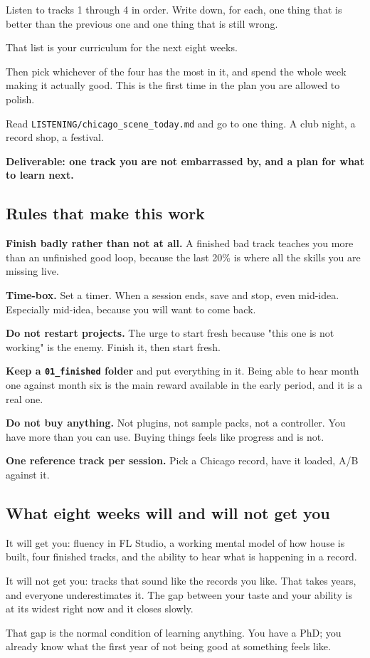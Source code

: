 Listen to tracks 1 through 4 in order. Write down, for each, one thing that is better than
the previous one and one thing that is still wrong.

That list is your curriculum for the next eight weeks.

Then pick whichever of the four has the most in it, and spend the whole week making it
actually good. This is the first time in the plan you are allowed to polish.

Read \texttt{LISTENING/chicago\_scene\_today.md} and go to one thing. A club night, a record shop, a
festival.

\textbf{Deliverable: one track you are not embarrassed by, and a plan for what to learn next.}

\subsection{Rules that make this work}\label{pr01_eight_weeks-rules-that-make-this-work}

\textbf{Finish badly rather than not at all.} A finished bad track teaches you more than an
unfinished good loop, because the last 20\% is where all the skills you are missing live.

\textbf{Time-box.} Set a timer. When a session ends, save and stop, even mid-idea. Especially
mid-idea, because you will want to come back.

\textbf{Do not restart projects.} The urge to start fresh because "this one is not working" is
the enemy. Finish it, then start fresh.

\textbf{Keep a \texttt{01\_finished} folder} and put everything in it. Being able to hear month one
against month six is the main reward available in the early period, and it is a real one.

\textbf{Do not buy anything.} Not plugins, not sample packs, not a controller. You have more than
you can use. Buying things feels like progress and is not.

\textbf{One reference track per session.} Pick a Chicago record, have it loaded, A/B against it.

\subsection{What eight weeks will and will not get you}\label{pr01_eight_weeks-what-eight-weeks-will-and-will-not-get-you}

It will get you: fluency in FL Studio, a working mental model of how house is built, four
finished tracks, and the ability to hear what is happening in a record.

It will not get you: tracks that sound like the records you like. That takes years, and
everyone underestimates it. The gap between your taste and your ability is at its widest
right now and it closes slowly.

That gap is the normal condition of learning anything. You have a PhD; you already know what
the first year of not being good at something feels like.
